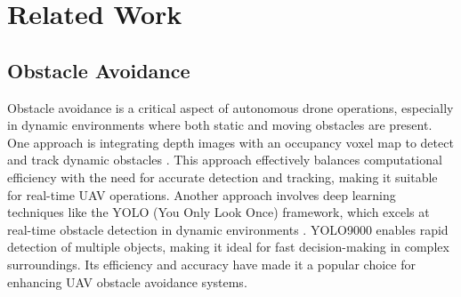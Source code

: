 \documentclass[3p,times]{elsarticle}
\begin{document}








    \newpage \section{Related Work} \label{sec:related}

    \subsection{Obstacle Avoidance}
    Obstacle avoidance is a critical aspect of autonomous drone operations, especially in dynamic environments where both static and moving obstacles are present. One approach is integrating depth images with an occupancy voxel map to detect and track dynamic obstacles \cite{xu2023real}. This approach effectively balances computational efficiency with the need for accurate detection and tracking, making it suitable for real-time UAV operations. Another approach involves deep learning techniques like the YOLO (You Only Look Once) framework, which excels at real-time obstacle detection in dynamic environments \cite{redmon2017yolo9000}. YOLO9000 enables rapid detection of multiple objects, making it ideal for fast decision-making in complex surroundings. Its efficiency and accuracy have made it a popular choice for enhancing UAV obstacle avoidance systems.
\end{document}
